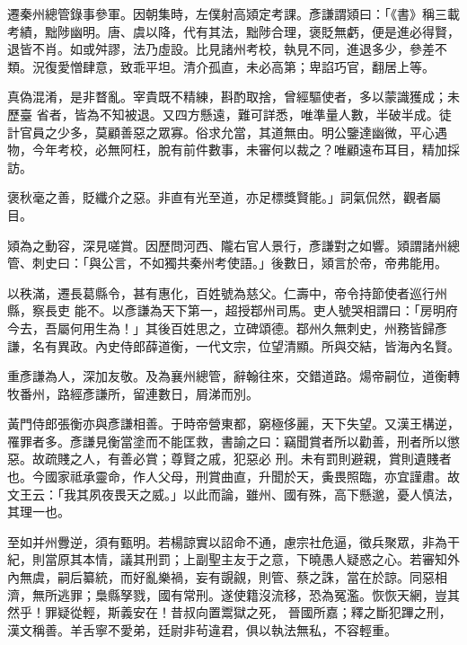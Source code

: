 \begin{pinyinscope}
 遷秦州總管錄事參軍。因朝集時，左僕射高熲定考課。彥謙謂熲曰：「《書》稱三載考績，黜陟幽明。唐、虞以降，代有其法，黜陟合理，褒貶無虧，便是進必得賢，退皆不肖。如或舛謬，法乃虛設。比見諸州考校，執見不同，進退多少，參差不類。況復愛憎肆意，致乖平坦。清介孤直，未必高第；卑諂巧官，翻居上等。



 真偽混淆，是非瞀亂。宰貴既不精練，斟酌取捨，曾經驅使者，多以蒙識獲成；未歷臺
 省者，皆為不知被退。又四方懸遠，難可詳悉，唯準量人數，半破半成。徒計官員之少多，莫顧善惡之眾寡。俗求允當，其道無由。明公鑒達幽微，平心遇物，今年考校，必無阿枉，脫有前件數事，未審何以裁之？唯顧遠布耳目，精加採訪。



 褒秋毫之善，貶纖介之惡。非直有光至道，亦足標獎賢能。」詞氣侃然，觀者屬目。



 熲為之動容，深見嗟賞。因歷問河西、隴右官人景行，彥謙對之如響。熲謂諸州總管、刺史曰：「與公言，不如獨共秦州考使語。」後數日，熲言於帝，帝弗能用。



 以秩滿，遷長葛縣令，甚有惠化，百姓號為慈父。仁壽中，帝令持節使者巡行州縣，察長吏
 能不。以彥謙為天下第一，超授鄀州司馬。吏人號哭相謂曰：「房明府今去，吾屬何用生為！」其後百姓思之，立碑頌德。鄀州久無刺史，州務皆歸彥謙，名有異政。內史侍郎薛道衡，一代文宗，位望清顯。所與交結，皆海內名賢。



 重彥謙為人，深加友敬。及為襄州總管，辭翰往來，交錯道路。煬帝嗣位，道衡轉牧番州，路經彥謙所，留連數日，屑涕而別。



 黃門侍郎張衡亦與彥謙相善。于時帝營東都，窮極侈麗，天下失望。又漢王構逆，罹罪者多。彥謙見衡當塗而不能匡救，書諭之曰：竊聞賞者所以勸善，刑者所以懲惡。故疏賤之人，有善必賞；尊賢之戚，犯惡必
 刑。未有罰則避親，賞則遺賤者也。今國家祗承靈命，作人父母，刑賞曲直，升聞於天，夤畏照臨，亦宜謹肅。故文王云：「我其夙夜畏天之威。」以此而論，雖州、國有殊，高下懸邈，憂人慎法，其理一也。



 至如并州釁逆，須有甄明。若楊諒實以詔命不通，慮宗社危逼，徵兵聚眾，非為干紀，則當原其本情，議其刑罰；上副聖主友于之意，下曉愚人疑惑之心。若審知外內無虞，嗣后纂統，而好亂樂禍，妄有覬覦，則管、蔡之誅，當在於諒。同惡相濟，無所逃罪；梟縣孥戮，國有常刑。遂使籍沒流移，恐為冤濫。恢恢天網，豈其然乎！罪疑從輕，斯義安在！昔叔向置鬻獄之死，
 晉國所嘉；釋之斷犯蹕之刑，漢文稱善。羊舌寧不愛弟，廷尉非茍違君，俱以執法無私，不容輕重。




\end{pinyinscope}
